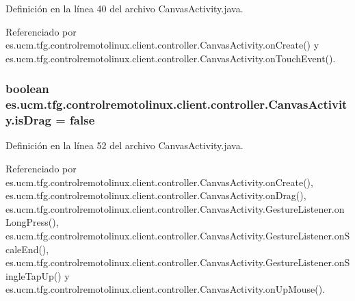 Definición en la línea 40 del archivo Canvas\-Activity.\-java.



Referenciado por es.\-ucm.\-tfg.\-controlremotolinux.\-client.\-controller.\-Canvas\-Activity.\-on\-Create() y es.\-ucm.\-tfg.\-controlremotolinux.\-client.\-controller.\-Canvas\-Activity.\-on\-Touch\-Event().

\hypertarget{classes_1_1ucm_1_1tfg_1_1controlremotolinux_1_1client_1_1controller_1_1CanvasActivity_a234c2998bfb3ee769792e760357425a1}{
\subsubsection[{is\-Drag}]{\setlength{\rightskip}{0pt plus 5cm}boolean es.\-ucm.\-tfg.\-controlremotolinux.\-client.\-controller.\-Canvas\-Activity.\-is\-Drag = false\hspace{0.3cm}{\ttfamily [private]}}}\label{classes_1_1ucm_1_1tfg_1_1controlremotolinux_1_1client_1_1controller_1_1CanvasActivity_a234c2998bfb3ee769792e760357425a1}


Definición en la línea 52 del archivo Canvas\-Activity.\-java.



Referenciado por es.\-ucm.\-tfg.\-controlremotolinux.\-client.\-controller.\-Canvas\-Activity.\-on\-Create(), es.\-ucm.\-tfg.\-controlremotolinux.\-client.\-controller.\-Canvas\-Activity.\-on\-Drag(), es.\-ucm.\-tfg.\-controlremotolinux.\-client.\-controller.\-Canvas\-Activity.\-Gesture\-Listener.\-on\-Long\-Press(), es.\-ucm.\-tfg.\-controlremotolinux.\-client.\-controller.\-Canvas\-Activity.\-Gesture\-Listener.\-on\-Scale\-End(), es.\-ucm.\-tfg.\-controlremotolinux.\-client.\-controller.\-Canvas\-Activity.\-Gesture\-Listener.\-on\-Single\-Tap\-Up() y es.\-ucm.\-tfg.\-controlremotolinux.\-client.\-controller.\-Canvas\-Activity.\-on\-Up\-Mouse().


